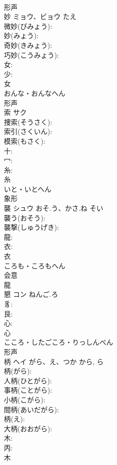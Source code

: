 \documentclass[8pt]{extreport}
\begin{document}
\begin{CJK}{UTF8}{min}
\\	形声 
\\	妙	ミョウ、ビョウ	たえ		
\\	微妙(びみょう): 
\\	妙(みょう): 
\\	奇妙(きみょう): 
\\	巧妙(こうみょう): 
\\	女: 
\\	少: 
\\	女	
\\	おんな・おんなへん	
\\	形声 
\\	索	サク			
\\	捜索(そうさく): 
\\	索引(さくいん): 
\\	模索(もさく): 
\\	十: 
\\	冖: 
\\	糸: 
\\	糸	
\\	いと・いとへん	
\\	象形 
\\	襲	シュウ	おそ.う、かさ.ね	そい	
\\	襲う(おそう): 
\\	襲撃(しゅうげき): 
\\	龍: 
\\	衣: 
\\	衣	
\\	ころも・ころもへん	
\\	会意 
\\	龍 
\\	懇	コン	ねんご.ろ		
\\	豸: 
\\	艮: 
\\	心: 
\\	心	
\\	こころ・したごころ・りっしんべん	
\\	形声 
\\	柄	ヘイ	がら、え、つか	から, ら	
\\	柄(がら): 
\\	人柄(ひとがら): 
\\	事柄(ことがら): 
\\	小柄(こがら): 
\\	間柄(あいだがら): 
\\	柄(え): 
\\	大柄(おおがら): 
\\	木: 
\\	丙: 
\\	木	

\end{CJK}
\end{document}
